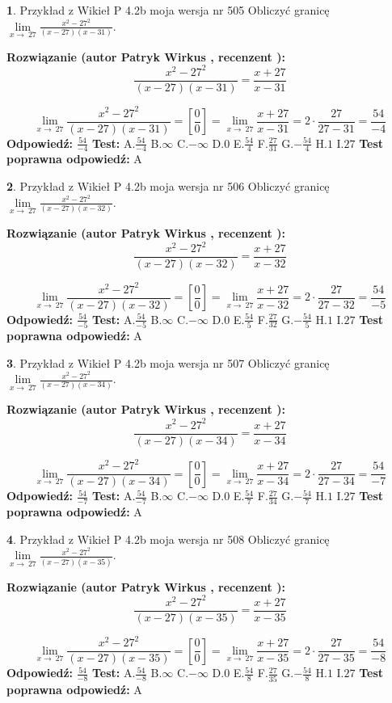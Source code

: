 \documentclass[12pt, a4paper]{article}
\theoremstyle{definition} %
\newtheorem{zad}{}
\newcommand{\zadStart}[1]{\begin{zad}#1\newline}
\newcommand{\zadStop}{\end{zad}}
\newcommand{\rozwStart}[2]{\noindent \textbf{Rozwiązanie (autor #1 , recenzent #2): }\newline}
\newcommand{\rozwStop}{\newline}
\newcommand{\odpStart}{\noindent \textbf{Odpowiedź:}\newline}
\newcommand{\odpStop}{\newline}
\newcommand{\testStart}{\noindent \textbf{Test:}\newline}
\newcommand{\testStop}{\newline}
\newcommand{\kluczStart}{\noindent \textbf{Test poprawna odpowiedź:}\newline}
\newcommand{\kluczStop}{\newline}
\begin{document}
\zadStart{Przykład z Wikieł P 4.2b moja wersja nr 505}
Obliczyć granicę $\lim\limits_{x\to\ 27}\frac{x^{2}-27^{2}}{(x-27)(x-31)}$.
\zadStop
\rozwStart{Patryk Wirkus}{}
$$\frac{x^{2}-27^{2}}{(x-27)(x-31)}=\frac{x+27}{x-31}$$

$$\lim\limits_{x\to\ 27}\frac{x^{2}-27^{2}}{(x-27)(x-31)}=[\frac{0}{0}]=\lim\limits_{x\to\ 27}\frac{x+27}{x-31}=2 \cdot \frac{27}{27-31} = \frac{54}{-4}$$
\rozwStop
\odpStart
$\frac{54}{-4}$
\odpStop
\testStart
A.$\frac{54}{-4}$
B.$\infty$
C.$-\infty$
D.$0$
E.$\frac{54}{4}$
F.$\frac{27}{31}$
G.$-\frac{54}{4}$
H.$1$
I.$27$
\testStop
\kluczStart
A
\kluczStop



\zadStart{Przykład z Wikieł P 4.2b moja wersja nr 506}
Obliczyć granicę $\lim\limits_{x\to\ 27}\frac{x^{2}-27^{2}}{(x-27)(x-32)}$.
\zadStop
\rozwStart{Patryk Wirkus}{}
$$\frac{x^{2}-27^{2}}{(x-27)(x-32)}=\frac{x+27}{x-32}$$

$$\lim\limits_{x\to\ 27}\frac{x^{2}-27^{2}}{(x-27)(x-32)}=[\frac{0}{0}]=\lim\limits_{x\to\ 27}\frac{x+27}{x-32}=2 \cdot \frac{27}{27-32} = \frac{54}{-5}$$
\rozwStop
\odpStart
$\frac{54}{-5}$
\odpStop
\testStart
A.$\frac{54}{-5}$
B.$\infty$
C.$-\infty$
D.$0$
E.$\frac{54}{5}$
F.$\frac{27}{32}$
G.$-\frac{54}{5}$
H.$1$
I.$27$
\testStop
\kluczStart
A
\kluczStop



\zadStart{Przykład z Wikieł P 4.2b moja wersja nr 507}
Obliczyć granicę $\lim\limits_{x\to\ 27}\frac{x^{2}-27^{2}}{(x-27)(x-34)}$.
\zadStop
\rozwStart{Patryk Wirkus}{}
$$\frac{x^{2}-27^{2}}{(x-27)(x-34)}=\frac{x+27}{x-34}$$

$$\lim\limits_{x\to\ 27}\frac{x^{2}-27^{2}}{(x-27)(x-34)}=[\frac{0}{0}]=\lim\limits_{x\to\ 27}\frac{x+27}{x-34}=2 \cdot \frac{27}{27-34} = \frac{54}{-7}$$
\rozwStop
\odpStart
$\frac{54}{-7}$
\odpStop
\testStart
A.$\frac{54}{-7}$
B.$\infty$
C.$-\infty$
D.$0$
E.$\frac{54}{7}$
F.$\frac{27}{34}$
G.$-\frac{54}{7}$
H.$1$
I.$27$
\testStop
\kluczStart
A
\kluczStop



\zadStart{Przykład z Wikieł P 4.2b moja wersja nr 508}
Obliczyć granicę $\lim\limits_{x\to\ 27}\frac{x^{2}-27^{2}}{(x-27)(x-35)}$.
\zadStop
\rozwStart{Patryk Wirkus}{}
$$\frac{x^{2}-27^{2}}{(x-27)(x-35)}=\frac{x+27}{x-35}$$

$$\lim\limits_{x\to\ 27}\frac{x^{2}-27^{2}}{(x-27)(x-35)}=[\frac{0}{0}]=\lim\limits_{x\to\ 27}\frac{x+27}{x-35}=2 \cdot \frac{27}{27-35} = \frac{54}{-8}$$
\rozwStop
\odpStart
$\frac{54}{-8}$
\odpStop
\testStart
A.$\frac{54}{-8}$
B.$\infty$
C.$-\infty$
D.$0$
E.$\frac{54}{8}$
F.$\frac{27}{35}$
G.$-\frac{54}{8}$
H.$1$
I.$27$
\testStop
\kluczStart
A
\kluczStop
\end{document}
